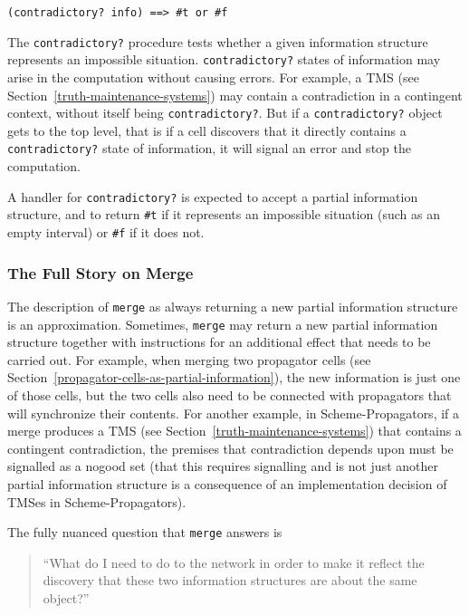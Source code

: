 \documentclass[12pt,letterpaper,english]{article}
\begin{document}
\texttt{(contradictory? info)  ==>  {\#}t or {\#}f}

The \texttt{contradictory?} procedure tests whether a given information
structure represents an impossible situation.  \texttt{contradictory?}
states of information may arise in the computation without causing
errors.  For example, a TMS (see Section~\ref{truth-maintenance-systems})
may contain a contradiction in
a contingent context, without itself being \texttt{contradictory?}.  But if
a \texttt{contradictory?} object gets to the top level, that is if a cell
discovers that it directly contains a \texttt{contradictory?} state of
information, it will signal an error and stop the computation.

A handler for \texttt{contradictory?} is expected to accept a partial
information structure, and to return \texttt{{\#}t} if it represents an
impossible situation (such as an empty interval) or \texttt{{\#}f} if it does
not.



\hypertarget{the-full-story-on-merge}{}
\subsubsection{The Full Story on Merge}
\label{the-full-story-on-merge}

The description of \texttt{merge} as always returning a new partial
information structure is an approximation.  Sometimes, \texttt{merge} may
return a new partial information structure together with instructions
for an additional effect that needs to be carried out.  For example,
when merging two propagator cells
(see Section~\ref{propagator-cells-as-partial-information}),
the new information is just one of those cells, but the two cells also
need to be connected with propagators that will synchronize their
contents.  For another example, in Scheme-Propagators, if a merge
produces a TMS (see Section~\ref{truth-maintenance-systems})
that contains a contingent contradiction,
the premises that contradiction depends upon must be signalled as a
nogood set (that this requires signalling and is not just another
partial information structure is a consequence of an implementation
decision of TMSes in Scheme-Propagators).

The fully nuanced question that \texttt{merge} answers is
\begin{quote}

``What do I need to do to the network in order to make it reflect
the discovery that these two information structures are about the
same object?''
\end{quote}
\end{document}
